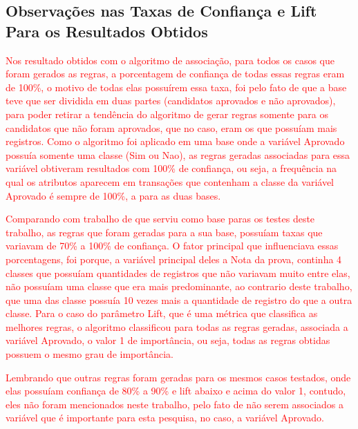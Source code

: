 \subsection{Observações nas Taxas de Confiança e Lift Para os Resultados Obtidos}

\par
\textcolor{red}{Nos resultado obtidos com o algoritmo de associação, para todos os casos que foram gerados as regras, a porcentagem de confiança de todas essas regras eram de 100\%, o motivo de todas elas possuírem essa taxa, foi pelo fato de que a base teve que ser dividida em duas partes (candidatos aprovados e não aprovados), para poder retirar a tendência  do algoritmo de gerar regras somente para os candidatos que não foram aprovados, que no caso, eram os que possuíam mais registros. Como o algoritmo foi aplicado em uma base onde a variável Aprovado possuía somente uma classe (Sim ou Nao), as regras geradas associadas para essa variável obtiveram resultados com 100\% de confiança, ou seja, a frequência na qual os atributos aparecem em transações que contenham a classe da variável Aprovado é sempre de 100\%, a para as duas bases. }

\par
\textcolor{red}{Comparando com trabalho de  que serviu como base paras os testes deste trabalho, as regras que foram geradas para a sua base, possuíam taxas que variavam de 70\% a 100\% de confiança. O fator principal que influenciava essas porcentagens, foi porque, a variável principal deles a Nota da prova, continha 4 classes que possuíam quantidades de registros que não variavam muito entre elas, não possuíam uma classe que era mais predominante, ao contrario deste trabalho, que uma das classe possuía 10 vezes mais a quantidade de registro do que a outra classe. Para o caso do parâmetro Lift, que é uma métrica que classifica as melhores regras, o algoritmo classificou para todas as regras geradas, associada a variável Aprovado, o valor 1 de importância, ou seja, todas as regras obtidas possuem o mesmo grau de importância.}

\par
\textcolor{red}{Lembrando que outras regras foram geradas para os mesmos casos testados, onde elas possuíam confiança de 80\% a 90\% e lift abaixo e acima do valor 1, contudo, eles não foram mencionados neste trabalho, pelo fato de não serem associados a variável que é importante para esta pesquisa, no caso, a variável Aprovado.}